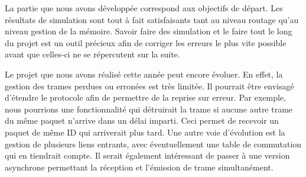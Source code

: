\documentclass[a4paper,11pt]{article}
\begin{document}
La partie que nous avons développée correspond aux objectifs de départ. Les résultats de simulation sont tout à fait satisfaisants tant au niveau routage qu'au niveau gestion de la mémoire. Savoir faire des simulation et le faire tout le long du projet est un outil précieux afin de corriger les erreurs le plus vite possible avant que celles-ci ne se répercutent sur la suite.

Le projet que nous avons réalisé cette année peut encore évoluer.
En effet, la gestion des trames perdues ou erronées est très limitée.
Il pourrait être envisagé d'étendre le protocole afin de permettre de la
reprise sur erreur. Par exemple, nous pourrions une fonctionnalité qui détruirait la trame si aucune autre trame du même paquet 
n'arrive dans un délai imparti. Ceci permet de recevoir un paquet de
même ID qui arriverait plus tard. Une autre voie d'évolution est la
gestion de plusieurs liens entrants, avec éventuellement une table de
commutation qui en tiendrait compte. Il serait également intéressant de
passer à une version asynchrone permettant la réception et l'émission de
trame simultanément.
\end{document}
